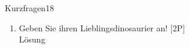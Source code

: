 \begin{exercise}{Kurzfragen}{18}
  \begin{enumerate}
    \item Geben Sie ihren Lieblingsdinosaurier an!
      \hfill [2P]
      \ifdisplaysolutions
        \\ Lösung
      \else
        \vspace{4cm}
      \fi
  \end{enumerate}
\end{exercise}
